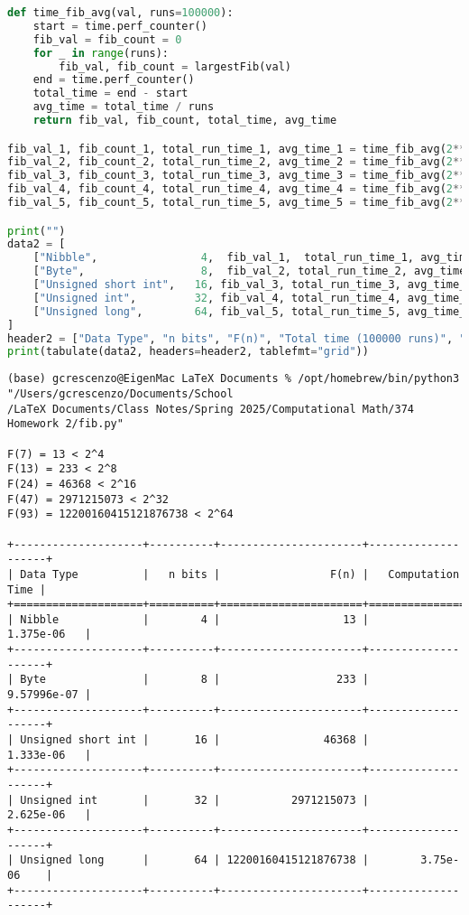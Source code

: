 \documentclass[11pt,twoside,openany]{memoir}
\begin{document}
\begin{enumerate}[label = (\roman*),itemsep=1pt,topsep=3pt]
\begin{lstlisting}[language=Python, basicstyle=\ttfamily\tiny,]
def time_fib_avg(val, runs=100000):
    start = time.perf_counter()
    fib_val = fib_count = 0
    for _ in range(runs):
        fib_val, fib_count = largestFib(val)
    end = time.perf_counter()
    total_time = end - start
    avg_time = total_time / runs
    return fib_val, fib_count, total_time, avg_time

fib_val_1, fib_count_1, total_run_time_1, avg_time_1 = time_fib_avg(2**4, 100000)
fib_val_2, fib_count_2, total_run_time_2, avg_time_2 = time_fib_avg(2**8, 100000)
fib_val_3, fib_count_3, total_run_time_3, avg_time_3 = time_fib_avg(2**16, 100000)
fib_val_4, fib_count_4, total_run_time_4, avg_time_4 = time_fib_avg(2**32, 100000)
fib_val_5, fib_count_5, total_run_time_5, avg_time_5 = time_fib_avg(2**64, 100000)

print("")
data2 = [
    ["Nibble",                4,  fib_val_1,  total_run_time_1, avg_time_1],
    ["Byte",                  8,  fib_val_2, total_run_time_2, avg_time_2],
    ["Unsigned short int",   16, fib_val_3, total_run_time_3, avg_time_3],
    ["Unsigned int",         32, fib_val_4, total_run_time_4, avg_time_4],
    ["Unsigned long",        64, fib_val_5, total_run_time_5, avg_time_5],
]
header2 = ["Data Type", "n bits", "F(n)", "Total time (100000 runs)", "Avg time per run"]
print(tabulate(data2, headers=header2, tablefmt="grid"))
            \end{lstlisting}





\vspace{20pt}
\begin{tcolorbox}
\begin{Verbatim}[fontsize=\tiny]
(base) gcrescenzo@EigenMac LaTeX Documents % /opt/homebrew/bin/python3 "/Users/gcrescenzo/Documents/School
/LaTeX Documents/Class Notes/Spring 2025/Computational Math/374 Homework 2/fib.py"

F(7) = 13 < 2^4
F(13) = 233 < 2^8
F(24) = 46368 < 2^16
F(47) = 2971215073 < 2^32
F(93) = 12200160415121876738 < 2^64

+--------------------+----------+----------------------+--------------------+
| Data Type          |   n bits |                 F(n) |   Computation Time |
+====================+==========+======================+====================+
| Nibble             |        4 |                   13 |        1.375e-06   |
+--------------------+----------+----------------------+--------------------+
| Byte               |        8 |                  233 |        9.57996e-07 |
+--------------------+----------+----------------------+--------------------+
| Unsigned short int |       16 |                46368 |        1.333e-06   |
+--------------------+----------+----------------------+--------------------+
| Unsigned int       |       32 |           2971215073 |        2.625e-06   |
+--------------------+----------+----------------------+--------------------+
| Unsigned long      |       64 | 12200160415121876738 |        3.75e-06    |
+--------------------+----------+----------------------+--------------------+


\end{Verbatim}
\end{tcolorbox}
\end{enumerate}
\end{document}
